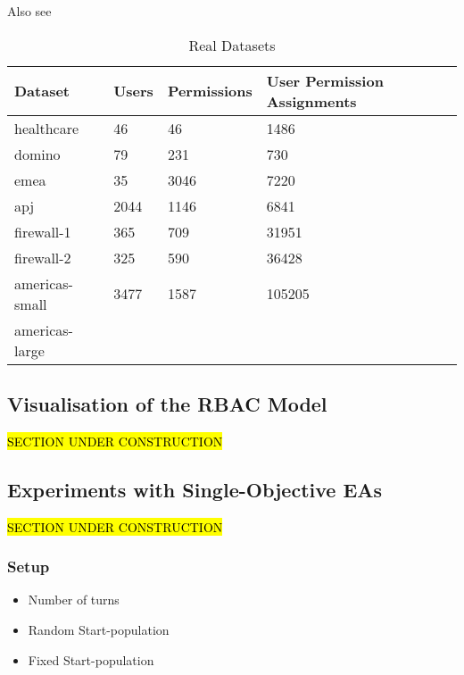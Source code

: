 Also see \cite{Xu}
\begin{table}
    \centering
    \begin{tabular}{|l|l|l|l|}
        \hline
        \rowcolor[HTML]{EFEFEF} 
        \textbf{Dataset} & \textbf{Users} & \textbf{Permissions} & \textbf{User Permission Assignments} \\ \hline
        healthcare       & 46             & 46                   & 1486                                 \\ \hline
        domino           & 79             & 231                  & 730                                  \\ \hline
        emea             & 35             & 3046                 & 7220                                 \\ \hline
        apj              & 2044           & 1146                 & 6841                                 \\ \hline
        firewall-1       & 365            & 709                  & 31951                                \\ \hline
        firewall-2       & 325            & 590                  & 36428                                \\ \hline
        americas-small   & 3477           & 1587                 & 105205                               \\ \hline
        americas-large   &                &                      &                                      \\ \hline
    \end{tabular}
    \caption{Real Datasets}
    \label{tab:realDatasets}
\end{table}



\subsection{Visualisation of the RBAC Model}
\hl{SECTION UNDER CONSTRUCTION}\\

\subsection{Experiments with Single-Objective EAs}
\hl{SECTION UNDER CONSTRUCTION}\\
\subsubsection{Setup}
\begin{itemize}
    \item Number of turns
    \item Random Start-population
    \item Fixed Start-population
\end{itemize}
